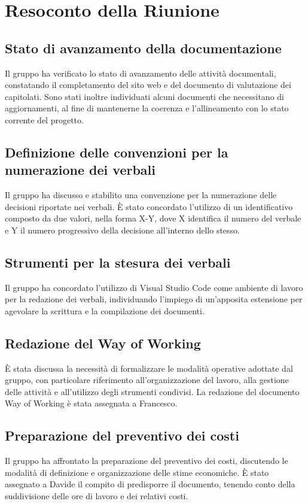 \documentclass[11pt, a4paper]{article}
\begin{document}
\section{Resoconto della Riunione}

\subsection{Stato di avanzamento della documentazione}
Il gruppo ha verificato lo stato di avanzamento delle attività documentali, constatando il completamento del sito web  e del documento di valutazione dei capitolati.
Sono stati inoltre individuati alcuni documenti che necessitano di aggiornamenti, al fine di mantenerne la coerenza e l'allineamento con lo stato corrente del progetto.

\subsection{Definizione delle convenzioni per la numerazione dei verbali}
Il gruppo ha discusso e stabilito una convenzione per la numerazione delle decisioni riportate nei verbali.
È stato concordato l'utilizzo di un identificativo composto da due valori, nella forma X-Y, dove X identifica il numero del verbale e Y il numero progressivo della decisione all'interno dello stesso.

\subsection{Strumenti per la stesura dei verbali}
Il gruppo ha concordato l'utilizzo di Visual Studio Code come ambiente di lavoro per la redazione dei verbali, individuando l'impiego di un'apposita estensione per agevolare la scrittura e la compilazione dei documenti.

\subsection{Redazione del Way of Working}
È stata discussa la necessità di formalizzare le modalità operative adottate dal gruppo, con particolare riferimento all'organizzazione del lavoro, alla gestione delle attività e all'utilizzo degli strumenti condivisi.
La redazione del documento Way of Working è stata assegnata a Francesco.

\subsection{Preparazione del preventivo dei costi}
Il gruppo ha affrontato la preparazione del preventivo dei costi, discutendo le modalità di definizione e organizzazione delle stime economiche.
È stato assegnato a Davide il compito di predisporre il documento, tenendo conto della suddivisione delle ore di lavoro e dei relativi costi.
\end{document}
